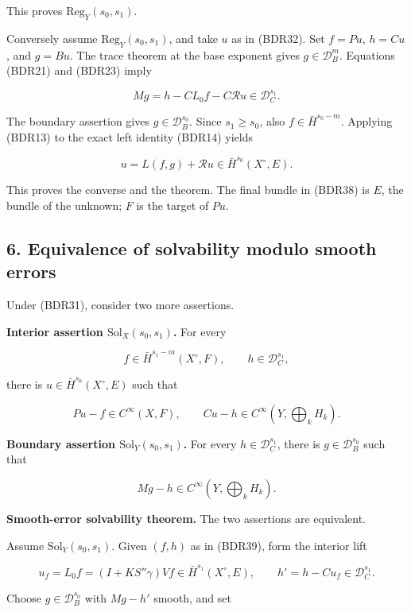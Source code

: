 \documentclass[
  11pt,
]{article}
\begin{document}
This proves \(\mathrm{Reg}_Y(s_0,s_1)\).

Conversely assume \(\mathrm{Reg}_Y(s_0,s_1)\), and take \(u\) as in
(BDR32). Set \(f=Pu\), \(h=Cu\), and \(g=Bu\). The trace theorem at the
base exponent gives \(g\in\mathcal D_B^m\). Equations (BDR21) and
(BDR23) imply

\[
 Mg=h-CL_0f-C\mathcal Ru\in\mathcal D_C^{s_1}.
 \tag{BDR37}
\]

The boundary assertion gives \(g\in\mathcal D_B^{s_0}\). Since
\(s_1\geq s_0\), also \(f\in\bar H^{s_0-m}\). Applying (BDR13) to the
exact left identity (BDR14) yields

\[
 u=L(f,g)+\mathcal Ru\in\bar H^{s_0}(X^\circ,E).
 \tag{BDR38}
\]

This proves the converse and the theorem. The final bundle in (BDR38) is
\(E\), the bundle of the unknown; \(F\) is the target of \(Pu\).

\subsection{6. Equivalence of solvability modulo smooth
errors}\label{equivalence-of-solvability-modulo-smooth-errors}

Under (BDR31), consider two more assertions.

\textbf{Interior assertion \(\mathrm{Sol}_X(s_0,s_1)\).} For every

\[
 f\in\bar H^{s_1-m}(X^\circ,F),\qquad
 h\in\mathcal D_C^{s_1},
 \tag{BDR39}
\]

there is \(u\in\bar H^{s_0}(X^\circ,E)\) such that

\[
 Pu-f\in C^\infty(X,F),\qquad
 Cu-h\in C^\infty(Y,\textstyle\bigoplus_kH_k).
 \tag{BDR40}
\]

\textbf{Boundary assertion \(\mathrm{Sol}_Y(s_0,s_1)\).} For every
\(h\in\mathcal D_C^{s_1}\), there is \(g\in\mathcal D_B^{s_0}\) such
that

\[
 Mg-h\in C^\infty(Y,\textstyle\bigoplus_kH_k).
 \tag{BDR41}
\]

\textbf{Smooth-error solvability theorem.} The two assertions are
equivalent.

Assume \(\mathrm{Sol}_Y(s_0,s_1)\). Given \((f,h)\) as in (BDR39), form
the interior lift

\[
 u_f=L_0f=(I+KS''\gamma)Vf\in\bar H^{s_1}(X^\circ,E),
 \qquad h'=h-Cu_f\in\mathcal D_C^{s_1}.
 \tag{BDR42}
\]

Choose \(g\in\mathcal D_B^{s_0}\) with \(Mg-h'\) smooth, and set
\end{document}
